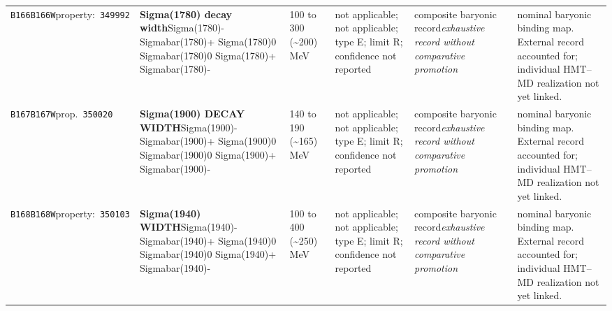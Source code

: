 \begin{landscape}
\begin{longtable}{L{1.85cm}L{4.45cm}L{2.35cm}L{4.05cm}L{3.35cm}L{7.15cm}}
\texttt{B166}\newline \texttt{B166W}\newline property:\ \texttt{349992} & \textbf{Sigma(1780) decay width}\newline Sigma(1780)- \textbar{}\allowbreak{} Sigmabar(1780)+ \textbar{}\allowbreak{} Sigma(1780)0 \textbar{}\allowbreak{} Sigmabar(1780)0 \textbar{}\allowbreak{} Sigma(1780)+ \textbar{}\allowbreak{} Sigmabar(1780)- & 100 to 300 (\textasciitilde{}200)\,MeV & not applicable; not applicable; type E; limit R; confidence not reported & composite baryonic record\newline \emph{exhaustive record without comparative promotion} & nominal baryonic binding map. External record accounted for; individual HMT--MD realization not yet linked. \\
\texttt{B167}\newline \texttt{B167W}\newline prop.\ \texttt{350020} & \textbf{Sigma(1900) DECAY WIDTH}\newline Sigma(1900)- \textbar{}\allowbreak{} Sigmabar(1900)+ \textbar{}\allowbreak{} Sigma(1900)0 \textbar{}\allowbreak{} Sigmabar(1900)0 \textbar{}\allowbreak{} Sigma(1900)+ \textbar{}\allowbreak{} Sigmabar(1900)- & 140 to 190 (\textasciitilde{}165)\,MeV & not applicable; not applicable; type E; limit R; confidence not reported & composite baryonic record\newline \emph{exhaustive record without comparative promotion} & nominal baryonic binding map. External record accounted for; individual HMT--MD realization not yet linked. \\
\texttt{B168}\newline \texttt{B168W}\newline property:\ \texttt{350103} & \textbf{Sigma(1940) WIDTH}\newline Sigma(1940)- \textbar{}\allowbreak{} Sigmabar(1940)+ \textbar{}\allowbreak{} Sigma(1940)0 \textbar{}\allowbreak{} Sigmabar(1940)0 \textbar{}\allowbreak{} Sigma(1940)+ \textbar{}\allowbreak{} Sigmabar(1940)- & 100 to 400 (\textasciitilde{}250)\,MeV & not applicable; not applicable; type E; limit R; confidence not reported & composite baryonic record\newline \emph{exhaustive record without comparative promotion} & nominal baryonic binding map. External record accounted for; individual HMT--MD realization not yet linked. \\

\end{longtable}
\end{landscape}
